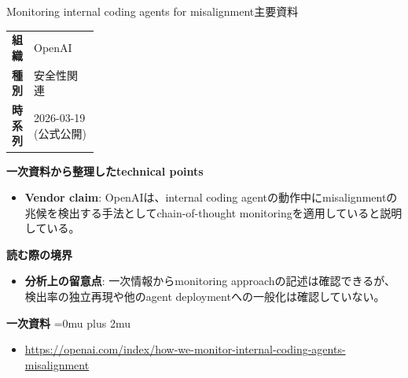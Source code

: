 \begin{technicalnote}{Monitoring internal coding agents for misalignment}{主要資料}
\begingroup
\begin{tabularx}{\linewidth}{@{}>{\bfseries}p{0.22\linewidth}X@{}}
組織 & OpenAI \\
種別 & 安全性関連 \\
時系列 & 2026-03-19 (公式公開) \\
\end{tabularx}
\smallskip
{\bfseries 一次資料から整理したtechnical points}
\begin{itemize}[leftmargin=1.5em,itemsep=0.35em]
\item \textbf{Vendor claim}: OpenAIは、internal coding agentの動作中にmisalignmentの兆候を検出する手法としてchain-of-thought monitoringを適用していると説明している。
\end{itemize}
\begin{minipage}{\linewidth}
{\bfseries 読む際の境界}
\begin{itemize}[leftmargin=1.5em,itemsep=0.35em]
\item \textbf{分析上の留意点}: 一次情報からmonitoring approachの記述は確認できるが、検出率の独立再現や他のagent deploymentへの一般化は確認していない。
\end{itemize}
\begin{samepage}
{\bfseries 一次資料}
\begingroup\sloppy
\Urlmuskip=0mu plus 2mu\relax
\begin{itemize}[leftmargin=1.5em,itemsep=0.25em]
\item {\scriptsize\url{https://openai.com/index/how-we-monitor-internal-coding-agents-misalignment}}
\end{itemize}
\endgroup
\end{samepage}
\end{minipage}
\endgroup
\end{technicalnote}
\medskip

